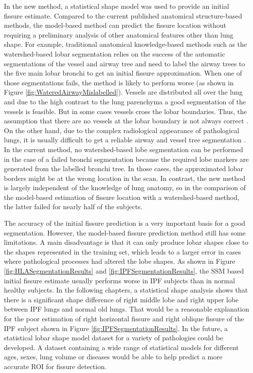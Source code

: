 {In the new method, a statistical shape model was used to provide an initial fissure estimate. Compared to the current published anatomical structure-based methods, the model-based method can predict the fissure location without requiring a preliminary analysis of other anatomical features other than lung shape. For example, traditional anatomical knowledge-based methods such as the watershed-based lobar segmentation relies on the success of the automatic segmentations of the vessel and airway tree and need to label the airway trees to the five main lobar bronchi to get an initial fissure approximation. When one of those segmentations fails, the method is likely to perform worse (as shown in Figure \ref{fig:WateredAirwayMislabelled}). Vessels are distributed all over the lung and due to the high contrast to the lung parenchyma a good segmentation of the vessels is feasible.  But in some cases vessels cross the lobar boundaries. Thus, the assumption that there are no vessels at the lobar boundary is not always correct \citep{pu2009pulmonary}. On the other hand, due to the complex radiological appearance of pathological lungs, it is usually difficult to get a reliable airway and vessel tree segmentation \citep{lassen2011interactive,lassen2013automatic}. In the current method, no watershed-based lobe segmentation can be performed in the case of a failed bronchi segmentation because the required lobe markers are generated from the labelled bronchi tree. In those cases, the approximated lobar borders might be at the wrong location in the scan. In contrast, the new method is largely independent of the knowledge of lung anatomy, so in the comparison of the model-based estimation of fissure location with a watershed-based method, the latter failed for nearly half of the subjects. 

The accuracy of the initial fissure prediction is a very important basis for a good segmentation. However, the model-based fissure prediction method still has some limitations.  A main disadvantage is that it can only produce lobar shapes close to the shapes represented in the training set, which leads to a larger error in cases where pathological processes had altered the lobe shapes. As shown in Figure \ref{fig:HLASegmentationResults} and \ref{fig:IPFSegmentationResults}, the SSM based initial fissure estimate usually performs worse in IPF subjects than in normal healthy subjects. In the following chapters, a statistical shape analysis shows that there is a significant shape difference of right middle lobe and right upper lobe between IPF lungs and normal old lungs. That would be a reasonable explanation for the poor estimation of right horizontal fissure and right oblique fissure of the IPF subject shown in Figure \ref{fig:IPFSegmentationResults}. In the future, a statistical lobar shape model dataset for a variety of pathologies could be developed. A dataset containing a wide range of statistical models for different ages, sexes, lung volume or diseases would be able to help predict a more accurate ROI for fissure detection.

}

